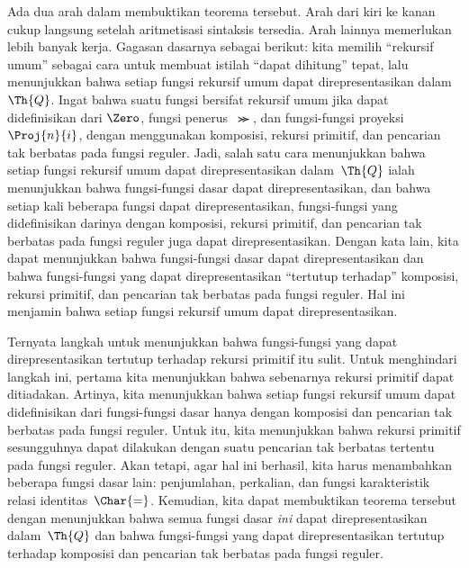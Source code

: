 \documentclass[../../../include/open-logic-section]{subfiles}
\begin{document}
Ada dua arah dalam membuktikan teorema tersebut. Arah dari kiri ke kanan
cukup langsung setelah aritmetisasi sintaksis tersedia. Arah lainnya
memerlukan lebih banyak kerja. Gagasan dasarnya sebagai berikut: kita memilih
``rekursif umum'' sebagai cara untuk membuat istilah ``dapat dihitung'' tepat,
lalu menunjukkan bahwa setiap fungsi rekursif umum dapat direpresentasikan
dalam~$\Th{Q}$.
Ingat bahwa suatu fungsi bersifat rekursif umum jika dapat didefinisikan dari
$\Zero$, fungsi penerus~$\Succ$, dan fungsi-fungsi proyeksi~$\Proj{n}{i}$,
dengan menggunakan komposisi, rekursi primitif, dan pencarian tak berbatas
pada fungsi reguler. Jadi, salah satu cara menunjukkan bahwa setiap fungsi
rekursif umum dapat direpresentasikan dalam~$\Th{Q}$ ialah menunjukkan bahwa
fungsi-fungsi dasar dapat direpresentasikan, dan bahwa setiap kali beberapa
fungsi dapat direpresentasikan, fungsi-fungsi yang didefinisikan darinya
dengan komposisi, rekursi primitif, dan pencarian tak berbatas pada fungsi
reguler juga dapat direpresentasikan. Dengan kata lain, kita dapat menunjukkan
bahwa fungsi-fungsi dasar dapat direpresentasikan dan bahwa fungsi-fungsi yang
dapat direpresentasikan ``tertutup terhadap'' komposisi, rekursi primitif,
dan pencarian tak berbatas pada fungsi reguler. Hal ini menjamin bahwa setiap
fungsi rekursif umum dapat direpresentasikan.

Ternyata langkah untuk menunjukkan bahwa fungsi-fungsi yang dapat
direpresentasikan tertutup
terhadap rekursi primitif itu sulit. Untuk menghindari langkah ini, pertama
kita menunjukkan bahwa sebenarnya rekursi primitif dapat ditiadakan. Artinya,
kita menunjukkan bahwa setiap fungsi rekursif umum dapat didefinisikan dari
fungsi-fungsi dasar hanya dengan komposisi dan pencarian tak berbatas pada
fungsi reguler. Untuk itu,
kita menunjukkan bahwa rekursi primitif sesungguhnya dapat dilakukan dengan
suatu pencarian tak berbatas tertentu pada fungsi reguler. Akan tetapi, agar
hal ini berhasil, kita
harus menambahkan beberapa fungsi dasar lain: penjumlahan, perkalian, dan
fungsi karakteristik relasi identitas~$\Char{=}$. Kemudian, kita dapat
membuktikan teorema tersebut dengan menunjukkan bahwa semua fungsi dasar
\emph{ini} dapat direpresentasikan dalam~$\Th{Q}$ dan bahwa fungsi-fungsi yang
dapat direpresentasikan tertutup terhadap komposisi dan pencarian tak berbatas
pada fungsi reguler.
\end{document}
